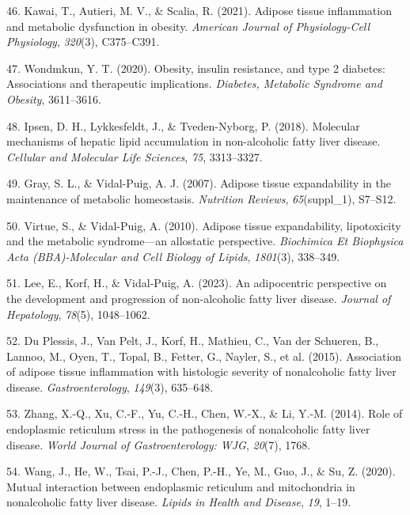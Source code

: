 \documentclass[
  11pt,
  letterpaper,
]{book}
\newlength{\cslhangindent}
\newenvironment{CSLReferences}[2] %
 {\begin{list}{}{%
  \setlength{\itemindent}{0pt}
  \setlength{\leftmargin}{0pt}
  \setlength{\parsep}{0pt}
  \ifodd #1
   \setlength{\leftmargin}{\cslhangindent}
   \setlength{\itemindent}{-1\cslhangindent}
  \fi
  \setlength{\itemsep}{#2\baselineskip}}}
 {\end{list}}
\begin{document}
\begin{CSLReferences}{1}{0}
46. Kawai, T., Autieri, M. V., \& Scalia, R. (2021). Adipose tissue
inflammation and metabolic dysfunction in obesity. \emph{American
Journal of Physiology-Cell Physiology}, \emph{320}(3), C375--C391.

47. Wondmkun, Y. T. (2020). Obesity, insulin resistance, and type 2
diabetes: Associations and therapeutic implications. \emph{Diabetes,
Metabolic Syndrome and Obesity}, 3611--3616.

48. Ipsen, D. H., Lykkesfeldt, J., \& Tveden-Nyborg, P. (2018).
Molecular mechanisms of hepatic lipid accumulation in non-alcoholic
fatty liver disease. \emph{Cellular and Molecular Life Sciences},
\emph{75}, 3313--3327.

49. Gray, S. L., \& Vidal-Puig, A. J. (2007). Adipose tissue
expandability in the maintenance of metabolic homeostasis.
\emph{Nutrition Reviews}, \emph{65}(suppl\_1), S7--S12.

50. Virtue, S., \& Vidal-Puig, A. (2010). Adipose tissue expandability,
lipotoxicity and the metabolic syndrome---an allostatic perspective.
\emph{Biochimica Et Biophysica Acta (BBA)-Molecular and Cell Biology of
Lipids}, \emph{1801}(3), 338--349.

51. Lee, E., Korf, H., \& Vidal-Puig, A. (2023). An adipocentric
perspective on the development and progression of non-alcoholic fatty
liver disease. \emph{Journal of Hepatology}, \emph{78}(5), 1048--1062.

52. Du Plessis, J., Van Pelt, J., Korf, H., Mathieu, C., Van der
Schueren, B., Lannoo, M., Oyen, T., Topal, B., Fetter, G., Nayler, S.,
et al. (2015). Association of adipose tissue inflammation with
histologic severity of nonalcoholic fatty liver disease.
\emph{Gastroenterology}, \emph{149}(3), 635--648.

53. Zhang, X.-Q., Xu, C.-F., Yu, C.-H., Chen, W.-X., \& Li, Y.-M.
(2014). Role of endoplasmic reticulum stress in the pathogenesis of
nonalcoholic fatty liver disease. \emph{World Journal of
Gastroenterology: WJG}, \emph{20}(7), 1768.

54. Wang, J., He, W., Tsai, P.-J., Chen, P.-H., Ye, M., Guo, J., \& Su,
Z. (2020). Mutual interaction between endoplasmic reticulum and
mitochondria in nonalcoholic fatty liver disease. \emph{Lipids in Health
and Disease}, \emph{19}, 1--19.


\end{CSLReferences}
\end{document}
